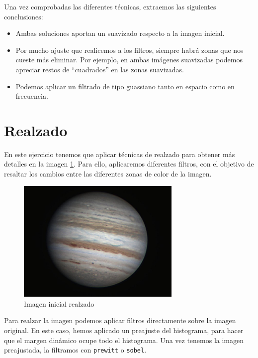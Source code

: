 \documentclass[12pt]{article}
\begin{document}
	\vspace{20px}

	\noindent Una vez comprobadas las diferentes técnicas, extraemos las siguientes conclusiones:
	\begin{itemize}
		\item Ambas soluciones aportan un suavizado respecto a la imagen inicial.
		\item Por mucho ajuste que realicemos a los filtros, siempre habrá zonas que nos cueste más eliminar. Por ejemplo, en ambas imágenes suavizadas podemos apreciar restos de ``cuadrados'' en las zonas suavizadas.
		\item Podemos aplicar un filtrado de tipo guassiano tanto en espacio como en frecuencia.
	\end{itemize}
	
	\pagebreak
	
	\section{Realzado}
	
	\noindent En este ejercicio tenemos que aplicar técnicas de realzado para obtener más detalles en la imagen \ref{img: realzado src}. Para ello, aplicaremos diferentes filtros, con el objetivo de resaltar los cambios entre las diferentes zonas de color de la imagen.
	
	\begin{figure}[h]
		\begin{center}
			\includegraphics[width=0.7\textwidth]{img/realzado.jpg}
			\caption{Imagen inicial realzado}
			\label{img: realzado src}
		\end{center}
	\end{figure}

	\noindent Para realzar la imagen podemos aplicar filtros directamente sobre la imagen original. En este caso, hemos aplicado un preajuste del histograma, para hacer que el margen dinámico ocupe todo el histograma. Una vez tenemos la imagen preajustada, la filtramos con \texttt{prewitt} o \texttt{sobel}.
	
\end{document}

